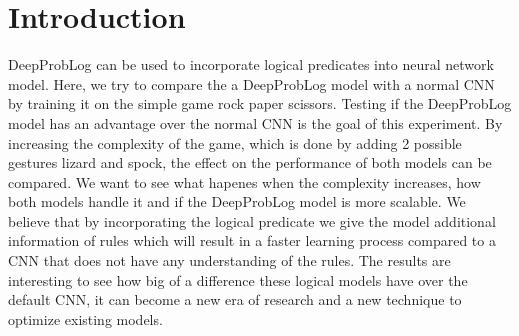 \section{Introduction}
DeepProbLog \cite{DBLP} can be used to incorporate logical predicates into neural network model. Here, we try to compare the a DeepProbLog model with a normal CNN by training it on the simple game rock paper scissors. Testing if the DeepProbLog model has an advantage over the normal CNN is the goal of this experiment. By increasing the complexity of the game, which is done by adding 2 possible gestures lizard and spock, the effect on the performance of both models can be compared. We want to see what hapenes when the complexity increases, how both models handle it and if the DeepProbLog model is more scalable. We believe that by incorporating the logical predicate we give the model additional information of rules which will result in a faster learning process compared to a CNN that does not have any understanding of the rules. The results are interesting to see how big of a difference these logical models have over the default CNN, it can become a new era of research and a new technique to optimize existing models.
